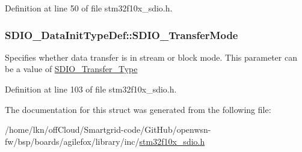 Definition at line 50 of file stm32f10x\+\_\+sdio.\+h.

\subsubsection[{\texorpdfstring{S\+D\+I\+O\+\_\+\+Transfer\+Mode}{SDIO_TransferMode}}]{ S\+D\+I\+O\+\_\+\+Data\+Init\+Type\+Def\+::\+S\+D\+I\+O\+\_\+\+Transfer\+Mode}\hypertarget{struct_s_d_i_o___data_init_type_def_a58ac19aaaceb2791d4bbcd30f334dd21}{}\label{struct_s_d_i_o___data_init_type_def_a58ac19aaaceb2791d4bbcd30f334dd21}
Specifies whether data transfer is in stream or block mode. This parameter can be a value of \hyperlink{group___s_d_i_o___transfer___type}{S\+D\+I\+O\+\_\+\+Transfer\+\_\+\+Type} 

Definition at line 103 of file stm32f10x\+\_\+sdio.\+h.



The documentation for this struct was generated from the following file\+:\begin{DoxyCompactItemize}
\item 
/home/lkn/off\+Cloud/\+Smartgrid-\/code/\+Git\+Hub/openwsn-\/fw/bsp/boards/agilefox/library/inc/\hyperlink{agilefox_2library_2inc_2stm32f10x__sdio_8h}{stm32f10x\+\_\+sdio.\+h}\end{DoxyCompactItemize}
